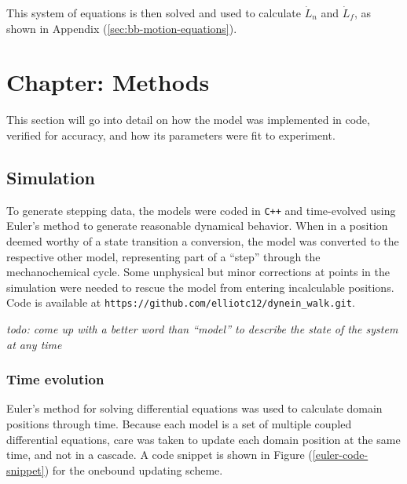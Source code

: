 \documentclass[10pt]{article} %
\begin{document}
This system of equations is then solved and used to calculate $\dot{L}_n$ and $\dot{L}_f$, as shown in Appendix (\ref{sec:bb-motion-equations}).

\section{Chapter: Methods}
This section will go into detail on how the model was implemented in code, verified for accuracy, and how its parameters were fit to experiment.\\

\subsection{Simulation}
To generate stepping data, the models were coded in \verb|C++| and time-evolved using Euler's method to generate reasonable dynamical behavior. When in a position deemed worthy of a state transition a conversion, the model was converted to the respective other model, representing part of a ``step'' through the mechanochemical cycle. Some unphysical but minor corrections at points in the simulation were needed to rescue the model from entering incalculable positions.\\

Code is available at \verb|https://github.com/elliotc12/dynein_walk.git|.



\textit{todo: come up with a better word than ``model'' to describe the state of the system at any time}
\subsubsection{Time evolution}
Euler's method for solving differential equations was used to calculate domain positions through time. Because each model is a set of multiple coupled differential equations, care was taken to update each domain position at the same time, and not in a cascade. A code snippet is shown in Figure (\ref{euler-code-snippet}) for the onebound updating scheme.
\end{document}
